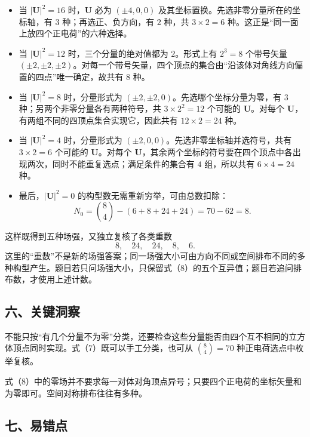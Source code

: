 \documentclass[12pt,a4paper,UTF8]{ctexart}
\newcommand{\tightlist}{\setlength{\itemsep}{0pt}\setlength{\parskip}{0pt}}
\begin{document}
\begin{itemize}
\tightlist
\item
  当 \(|\boldsymbol U|^2=16\) 时，\(\boldsymbol U\) 必为 \((\pm4,0,0)\)
  及其坐标置换。先选非零分量所在的坐标轴，有 \(3\)
  种；再选正、负方向，有 \(2\) 种，共 \(3\times2=6\)
  种。这正是``同一面上放四个正电荷''的六种选择。
\item
  当 \(|\boldsymbol U|^2=12\) 时，三个分量的绝对值都为 \(2\)。形式上有
  \(2^3=8\) 个带号矢量
  \((\pm2,\pm2,\pm2)\)。对每一个带号矢量，四个顶点的集合由``沿该体对角线方向偏置的四点''唯一确定，故共有
  \(8\) 种。
\item
  当 \(|\boldsymbol U|^2=8\) 时，分量形式为
  \((\pm2,\pm2,0)\)。先选哪个坐标分量为零，有 \(3\)
  种；另两个非零分量各有两种符号，共 \(3\times2^2=12\) 个可能的
  \(\boldsymbol U\)。对每个
  \(\boldsymbol U\)，有两组不同的四顶点集合实现它，因此共有
  \(12\times2=24\) 种。
\item
  当 \(|\boldsymbol U|^2=4\) 时，分量形式为
  \((\pm2,0,0)\)。先选非零坐标轴并选符号，共有 \(3\times2=6\) 个可能的
  \(\boldsymbol U\)。对每个
  \(\boldsymbol U\)，其余两个坐标的符号要在四个顶点中各出现两次，同时不能重复选点；满足条件的集合有
  \(4\) 组，所以共有 \(6\times4=24\) 种。
\item
  最后，\(|\boldsymbol U|^2=0\) 的构型数无需重新穷举，可由总数扣除： \[
  N_0=\binom84-(6+8+24+24)=70-62=8.
  \]
\end{itemize}

这样既得到五种场强，又独立复核了各类重数 \[
8,\quad 24,\quad 24,\quad 8,\quad 6.
\]
这里的``重数''不是新的场强答案；同一场强大小可由方向不同或空间排布不同的多种构型产生。题目若只问场强大小，只保留式（8）的五个互异值；题目若追问排布数，才使用上述计数。

\subsection{六、关键洞察}\label{ux516dux5173ux952eux6d1eux5bdf}

不能只按``有几个分量不为零''分类，还要检查这些分量能否由四个互不相同的立方体顶点同时实现。式（7）既可以手工分类，也可从
\(\binom84=70\) 种正电荷选点中枚举复核。

式（8）中的零场并不要求每一对体对角顶点异号；只要四个正电荷的坐标矢量和为零即可。空间对称排布往往有多种。

\subsection{七、易错点}\label{ux4e03ux6613ux9519ux70b9}
\end{document}
